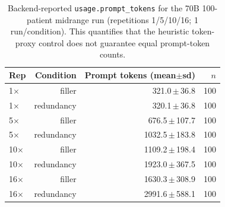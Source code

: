 \begin{table}[t]
  \centering
  \small
  \setlength{\tabcolsep}{5pt}
  \begin{tabular}{lrrr}
    \toprule
    Rep & Condition & Prompt tokens (mean$\pm$sd) & $n$ \\
    \midrule
    1$\times$ & filler & 321.0\,$\pm$\,36.8 & 100 \\
    1$\times$ & redundancy & 320.1\,$\pm$\,36.8 & 100 \\
    5$\times$ & filler & 676.5\,$\pm$\,107.7 & 100 \\
    5$\times$ & redundancy & 1032.5\,$\pm$\,183.8 & 100 \\
    10$\times$ & filler & 1109.2\,$\pm$\,198.4 & 100 \\
    10$\times$ & redundancy & 1923.0\,$\pm$\,367.5 & 100 \\
    16$\times$ & filler & 1630.3\,$\pm$\,308.9 & 100 \\
    16$\times$ & redundancy & 2991.6\,$\pm$\,588.1 & 100 \\
    \bottomrule
  \end{tabular}
  \caption{Backend-reported \texttt{usage.prompt\_tokens} for the 70B 100-patient midrange run (repetitions 1/5/10/16; 1 run/condition). This quantifies that the heuristic token-proxy control does not guarantee equal prompt-token counts.}
  \label{tab:usage_prompt_tokens_70b}
\end{table}

